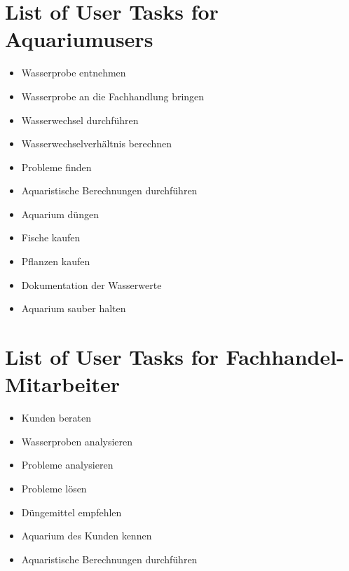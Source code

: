 \section{List of User Tasks for Aquariumusers}
\begin{itemize}
\item Wasserprobe entnehmen
\item Wasserprobe an die Fachhandlung bringen
\item Wasserwechsel durchführen
\item Wasserwechselverhältnis berechnen
\item Probleme finden
\item Aquaristische Berechnungen durchführen
\item Aquarium düngen
\item Fische kaufen
\item Pflanzen kaufen
\item Dokumentation der Wasserwerte
\item Aquarium sauber halten
\end{itemize}


\section{List of User Tasks for Fachhandel-Mitarbeiter}
\begin{itemize}
\item Kunden beraten
\item Wasserproben analysieren
\item Probleme analysieren
\item Probleme lösen
\item Düngemittel empfehlen
\item Aquarium des Kunden kennen
\item Aquaristische Berechnungen durchführen
\end{itemize}


